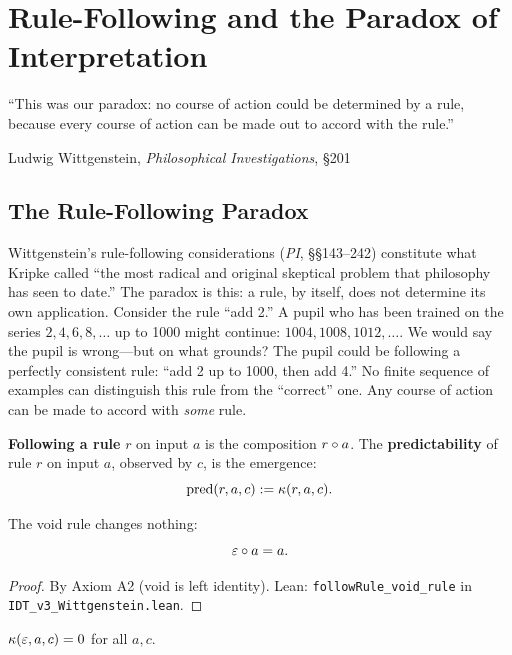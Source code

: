 \chapter{Rule-Following and the Paradox of Interpretation}
\label{ch:rule-following}

\epigraph{``This was our paradox: no course of action could be determined by a
rule, because every course of action can be made out to accord with the rule.''}{Ludwig Wittgenstein, \textit{Philosophical Investigations}, \S201}

\section{The Rule-Following Paradox}

Wittgenstein's rule-following considerations (\textit{PI}, \S\S143--242) constitute
what Kripke called ``the most radical and original skeptical problem that
philosophy has seen to date.'' The paradox is this: a rule, by itself, does not
determine its own application. Consider the rule ``add 2.'' A pupil who has
been trained on the series $2, 4, 6, 8, \ldots$ up to 1000 might continue:
$1004, 1008, 1012, \ldots$. We would say the pupil is wrong---but on what
grounds? The pupil could be following a perfectly consistent rule: ``add 2 up
to 1000, then add 4.'' No finite sequence of examples can distinguish this
rule from the ``correct'' one. Any course of action can be made to accord
with \emph{some} rule.

\begin{definition}
\label{def:rule-following}
\textbf{Following a rule} $r$ on input $a$ is the composition $r \circ a$.
The \textbf{predictability} of rule $r$ on input $a$, observed by $c$, is the
emergence:
\[
\mathrm{pred}(r, a, c) := \kappa(r, a, c).
\]
\end{definition}

\begin{theorem}
\label{thm:void-rule}
The void rule changes nothing:
\[
\varepsilon \circ a = a.
\]
\end{theorem}

\begin{proof}
By Axiom A2 (void is left identity).
Lean: \texttt{followRule\_void\_rule} in \texttt{IDT\_v3\_Wittgenstein.lean}.
\end{proof}

\begin{theorem}
\label{thm:void-predictable}
$\kappa(\varepsilon, a, c) = 0$ for all $a, c$.
\end{theorem}

